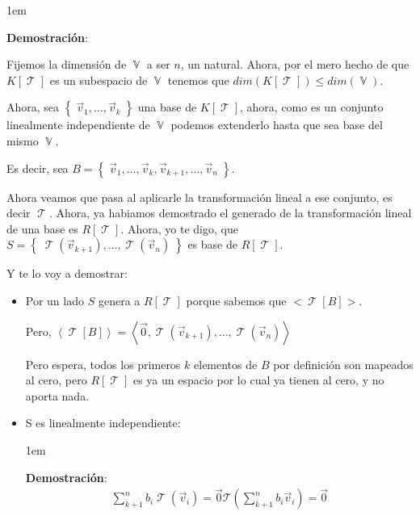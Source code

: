 \documentclass[12pt, fleqn]{article}                             %
\newenvironment{SmallIndentation}[1][0.75em]                    %
        {\begin{adjustwidth}{#1}{}\begin{footnotesize}}             %
        {\end{footnotesize}\end{adjustwidth}}                       %
\theoremstyle{break}                                            %
\DeclareMathOperator \VectorSet    {\mathbb{V}}                 %
\DeclareMathOperator \LinTrans {\mathcal{T}}                    %
\newcommand{\Set}[1]    {\left\{ \; #1 \; \right\}}             %
\newcommand{\Wrap}[1]    {\left( #1 \right)}                    %
\newcommand{\Generate}[1]{\left\langle #1 \right\rangle}        %
\newcommand{\FnLinTrans}[1]{\mathcal{T}\Wrap{#1}}               %
\begin{document}
\begin{itemize}
                \begin{SmallIndentation}[1em]
                    \textbf{Demostración}:
                    
                    Fijemos la dimensión de $\VectorSet$ a ser $n$, un natural.
                    Ahora, por el mero hecho de que $K[\LinTrans]$ es un subespacio de $\VectorSet$
                    tenemos que $dim(K[\LinTrans]) \leq dim(\VectorSet)$.

                    Ahora, sea $\Set{\vec v_1, \dots, \vec v_k}$ una base de $K[\LinTrans]$, ahora, como es un conjunto
                    linealmente independiente de $\VectorSet$ podemos extenderlo hasta que sea base del mismo
                    $\VectorSet$.

                    Es decir, sea $B = \Set{\vec v_1, \dots, \vec v_k, \vec v_{k+1}, \dots, \vec v_n}$.

                    Ahora veamos que pasa al aplicarle la transformación lineal a ese conjunto, es
                    decir $\LinTrans$.
                    Ahora, ya habiamos demostrado el generado de la transformación lineal de una base
                    es $R[\LinTrans]$.
                    Ahora, yo te digo, que $S = \Set{ \LinTrans(\vec v_{k+1}), \dots, \LinTrans(\vec v_n)}$
                    es base de $R[\LinTrans]$.

                    Y te lo voy a demostrar:
                    \begin{itemize}
                        \item 
                            Por un lado $S$ genera a $R[\LinTrans]$ porque sabemos que $<\LinTrans[B]>$.

                            Pero, 
                            $\Generate{\LinTrans[B]} 
                                = \Generate{\vec 0, \LinTrans(\vec v_{k+1}), \dots, \LinTrans(\vec v_n)}$

                            Pero espera, todos los primeros $k$ elementos de $B$ por definición son mapeados
                            al cero, pero $R[\LinTrans]$ es ya un espacio por lo cual ya tienen al cero, y no 
                            aporta nada.

                        \item
                            S es linealmente independiente:

                            \begin{SmallIndentation}[1em]
                                \textbf{Demostración}:
                                \begin{align*}
                                    \sum_{k+1}^n b_i \LinTrans(\vec v_i) = \vec 0
                                    \FnLinTrans{\sum_{k+1}^n b_i \vec v_i} = \vec 0
                                \end{align*}


\end{SmallIndentation}
\end{itemize}
\end{SmallIndentation}
\end{itemize}
\end{document}
